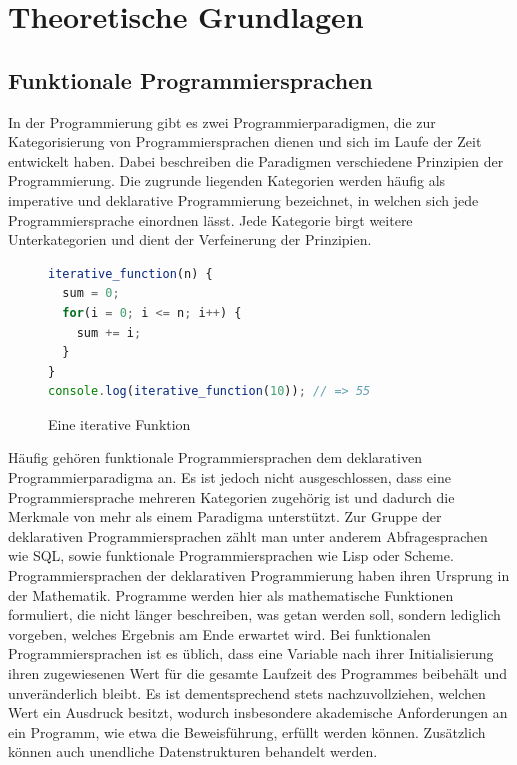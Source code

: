 \chapter{Theoretische Grundlagen}
\label{sec:grundlagen}
\pagestyle{plain}

\section{Funktionale Programmiersprachen}
\label{sec:funktionaleProgrammiersprache}
In der Programmierung gibt es zwei Programmierparadigmen, die zur Kategorisierung von Programmiersprachen dienen und sich im Laufe der Zeit entwickelt haben. %
Dabei beschreiben die Paradigmen verschiedene Prinzipien der Programmierung.
Die zugrunde liegenden Kategorien werden häufig als imperative und deklarative Programmierung bezeichnet, in welchen sich jede Programmiersprache einordnen lässt. Jede Kategorie birgt weitere Unterkategorien und dient der Verfeinerung der Prinzipien.
\begin{figure}[h]
\begin{lstlisting}[language=JavaScript]
iterative_function(n) {
  sum = 0;
  for(i = 0; i <= n; i++) {
    sum += i;
  }
}
console.log(iterative_function(10)); // => 55
\end{lstlisting}
\caption{Eine iterative Funktion}\label{fig:iterative-function}
\end{figure}
Häufig gehören funktionale Programmiersprachen dem deklarativen Programmierparadigma an. Es ist jedoch nicht ausgeschlossen, dass eine Programmiersprache mehreren Kategorien zugehörig ist und dadurch die Merkmale von mehr als einem Paradigma unterstützt. Zur Gruppe der deklarativen Programmiersprachen zählt man unter anderem Abfragesprachen wie SQL, sowie funktionale Programmiersprachen wie Lisp oder Scheme.
Programmiersprachen der deklarativen Programmierung haben ihren Ursprung in der Mathematik. Programme werden hier als mathematische Funktionen formuliert, die nicht länger beschreiben, was getan werden soll, sondern lediglich vorgeben, welches Ergebnis am Ende erwartet wird.
Bei funktionalen Programmiersprachen ist es üblich, dass eine Variable nach ihrer Initialisierung ihren zugewiesenen Wert für die gesamte Laufzeit des Programmes beibehält und unveränderlich bleibt. Es ist dementsprechend stets nachzuvollziehen, welchen Wert ein Ausdruck besitzt, wodurch insbesondere akademische Anforderungen an ein Programm, wie etwa die Beweisführung, erfüllt werden können. Zusätzlich können auch unendliche Datenstrukturen behandelt werden.
